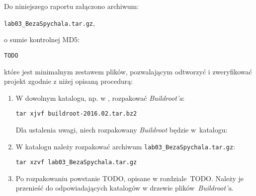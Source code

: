 \documentclass{article}
\newcommand{\labnumber}{3}
\begin{document}
Do niniejszego raportu załączono archiwum:
\begin{center}
\texttt{lab0\labnumber\_BezaSpychala.tar.gz},
\end{center}
o sumie kontrolnej MD5:
\begin{center}
\texttt{TODO}
\end{center}
które jest minimalnym zestawem plików, pozwalającym odtworzyć i zweryfikować projekt zgodnie z niżej opisaną procedurą:
\begin{enumerate}
\item W dowolnym katalogu, np. w , rozpakować \emph{Buildroot'a}:
\begin{center}
\texttt{tar xjvf buildroot-2016.02.tar.bz2}
\end{center}

Dla ustalenia uwagi, niech rozpakowany \emph{Buildroot} będzie w~katalogu:
\begin{center}
\end{center}

\item W katalogu  należy rozpakować archiwum \texttt{lab0\labnumber\_BezaSpychala.tar.gz}:
\begin{center}
\texttt{tar xzvf lab0\labnumber\_BezaSpychala.tar.gz}
\end{center}

\item Po rozpakowaniu powstanie TODO, opisane w rozdziale~TODO. Należy je przenieść do odpowiadających katalogów w drzewie plików~\emph{Buildroot'a}.
\end{enumerate}




\end{document}

